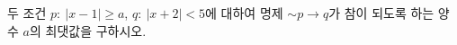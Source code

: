 두 조건 $p:\ |x-1|\ge a$, $q:\ |x+2|<5$에 대하여 명제 $\sim p\longrightarrow q$가 참이 되도록 하는 양수 $a$의 최댓값을 구하시오.
